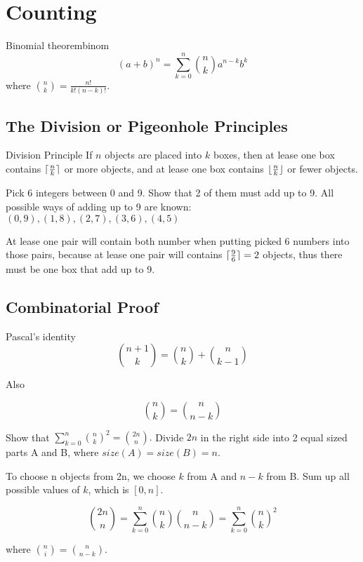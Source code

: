 \section{Counting}
\begin{fact}{Binomial theorem}{binom}
  \[
  (a+b)^n = \sum_{k=0}^n \binom{n}{k} a^{n-k}b^k
  \]
  where $\binom{n}{k} = \frac{n!}{k!(n-k)!}$.
\end{fact}

\subsection{The Division or Pigeonhole Principles}

\begin{fact}{Division Principle}{}
  If $n$ objects are placed into $k$ boxes,
  then at lease one box contains $\lceil\frac{n}{k}\rceil$ or more objects,
  and at lease one box contains $\lfloor\frac{n}{k}\rfloor$ or fewer objects.
\end{fact}

\begin{exec}{}{}
  Pick 6 integers between 0 and 9. Show that 2 of them must add up to 9.
  \tcblower
  All possible ways of adding up to 9 are known:
  $(0,9),(1,8),(2,7),(3,6),(4,5)$

  At lease one pair will contain both number when putting picked 6 numbers into those pairs, because at lease one pair will contains $\lceil\frac{9}{6}\rceil=2$ objects, thus there must be one box that add up to 9.
\end{exec}

\subsection{Combinatorial Proof}

\begin{fact}{Pascal’s identity}{}
  \[
  \binom{n+1}{k} = \binom{n}{k} + \binom{n}{k-1}
  \]
\end{fact}

Also

\[
{n \choose k} = {n \choose n-k}
\]

\begin{exec}{}{}
  Show that $\sum_{k=0}^{n}{n \choose k}^2 = {2n \choose n}.$
  \tcblower
  Divide $2n$ in the right side into 2 equal sized parts A and B, where $size(A)=size(B)=n$.

  To choose n objects from 2n, we choose $k$ from A and $n-k$ from B.
  Sum up all possible values of $k$, which is $[0,n]$.

  \[
  {2n \choose n} = \sum_{k=0}^{n}{n \choose k}{n \choose n-k} = \sum_{k=0}^{n}{n \choose k}^2
  \]

  where ${n \choose i} = {n \choose n-k}$.
\end{exec}

